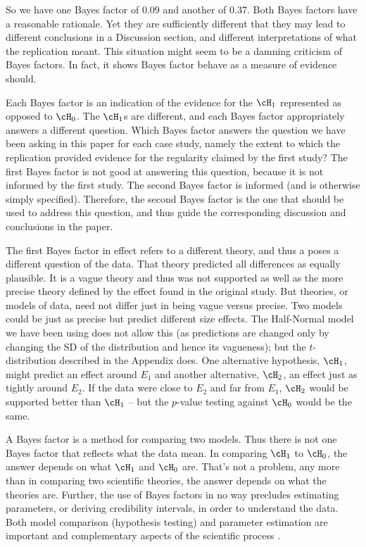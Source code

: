 So we have one Bayes factor of 0.09 and another of 0.37. Both Bayes factors have a reasonable rationale.  Yet they are sufficiently different that they may lead to different conclusions in a Discussion section, and different interpretations of what the replication meant. This situation might seem to be a damning criticism of Bayes factors.  In fact, it shows Bayes factor behave as a measure of evidence should. 

Each Bayes factor is an indication of the evidence for the $\cH_1$ represented as opposed to $\cH_0$. The $\cH_1$s are different, and each Bayes factor appropriately answers a different question. Which Bayes factor answers the question we have been asking in this paper for each case study, namely the extent to which the replication provided evidence for the regularity claimed by the first study?  The first Bayes factor is not good at answering this question, because it is not informed by the first study. The second Bayes factor is informed (and is otherwise simply specified). Therefore, the second Bayes factor is the one that should be used to address this question, and thus guide the corresponding discussion and conclusions in the paper.

The first Bayes factor in effect refers to a different theory, and thus a poses a different question of the data. That theory predicted all differences as equally plausible. It is a vague theory and thus was not supported as well as the more precise theory defined by the effect found in the original study. But theories, or models of data, need not differ just in being vague versus precise. Two models could be just as precise but predict different size effects. The Half-Normal model we have been using does not allow this (as predictions are changed only by changing the SD of the distribution and hence its vagueness); but the $t$-distribution described in the Appendix does. One alternative hypothesis, $\cH_1$, might predict an effect around $E_1$ and another alternative, $\cH_2$, an effect just as tightly around $E_2$. If the data were close to $E_2$ and far from $E_1$, $\cH_2$ would be supported better than $\cH_1$ -- but the $p$-value testing against $\cH_0$ would be the same.

A Bayes factor is a method for comparing two models. Thus there is not one Bayes factor that reflects what the data mean. In comparing $\cH_1$ to $\cH_0$, the answer depends on what $\cH_1$ and $\cH_0$ are. That's not a problem, any more than in comparing two scientific theories, the answer depends on what the theories are. Further, the use of Bayes factors in no way precludes estimating parameters, or deriving credibility intervals, in order to understand the data. Both model comparison (hypothesis testing) and parameter estimation are important and complementary aspects of the scientific process \cite{Jeffreys1939}.


